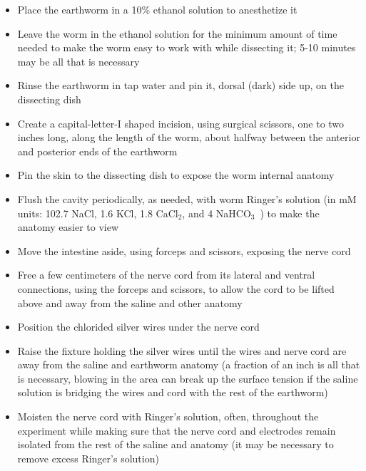 \begin{itemize}

\item Place the earthworm in a 10\% ethanol solution to anesthetize it

\item Leave the worm in the ethanol solution for the minimum amount of time needed to make the worm easy to work with while dissecting it; 5-10 minutes may be all that is necessary

\item Rinse the earthworm in tap water and pin it, dorsal (dark) side up, on the dissecting dish

\item Create a capital-letter-I shaped incision, using surgical scissors, one to two inches long, along the length of the worm, about halfway between the anterior and posterior ends of the earthworm

\item Pin the skin to the dissecting dish to expose the worm internal anatomy

\item Flush the cavity periodically, as needed, with worm Ringer's solution (in mM units: 102.7 NaCl, 1.6 KCl, 1.8 CaCl$_2$, and 4 NaHCO$_3$~\cite{KuehJellies}) to make the anatomy easier to view

\item Move the intestine aside, using forceps and scissors, exposing the nerve cord

\item Free a few centimeters of the nerve cord from its lateral and ventral connections, using the forceps and scissors, to allow the cord to be lifted above and away from the saline and other anatomy

\item Position the chlorided silver wires under the nerve cord

\item Raise the fixture holding the silver wires until the wires and nerve cord are away from the saline and earthworm anatomy (a fraction of an inch is all that is necessary, blowing in the area can break up the surface tension if the saline solution is bridging the wires and cord with the rest of the earthworm)

\item Moisten the nerve cord with Ringer's solution, often, throughout the experiment while making sure that the nerve cord and electrodes remain isolated from the rest of the saline and anatomy (it may be necessary to remove excess Ringer's solution)

\end{itemize}

